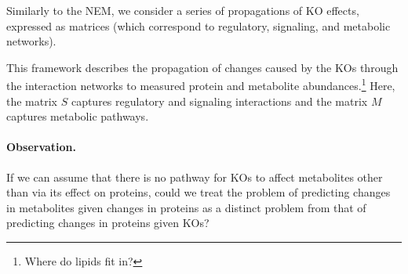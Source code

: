 \documentclass{article}
\begin{document}
Similarly to the NEM, we consider a series of propagations of KO effects, expressed as matrices (which correspond to regulatory, signaling, and metabolic networks).


This framework describes the propagation of changes caused by the KOs through the interaction networks to measured protein and metabolite abundances.\footnote{Where do lipids fit in?}
Here, the matrix $S$ captures regulatory and signaling interactions and the matrix $M$ captures metabolic pathways.

\paragraph{Observation.} If we can assume that there is no pathway for KOs to affect metabolites other than via its effect on proteins, could we treat the problem of predicting changes in metabolites given changes in proteins as a distinct problem from that of predicting changes in proteins given KOs?
\end{document}
